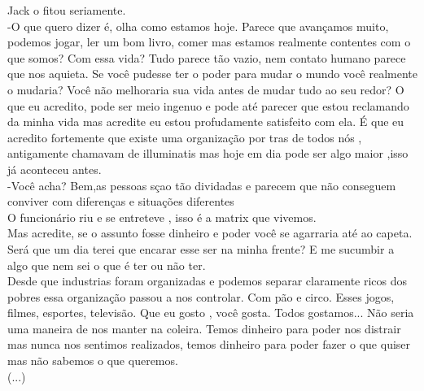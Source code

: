 \documentclass{book}
\begin{document}
Jack o fitou seriamente.\\
-O que quero dizer é, olha como estamos hoje. Parece que avançamos muito, podemos jogar, ler um bom livro, comer mas estamos realmente contentes com o que somos? Com essa vida? Tudo parece tão vazio, nem contato humano parece que nos aquieta. Se você pudesse ter o poder para mudar o mundo você realmente o mudaria? Você não melhoraria sua vida antes de mudar tudo ao seu redor? O que eu acredito, pode ser meio ingenuo e pode até parecer que estou reclamando da minha vida mas acredite eu estou profudamente satisfeito com ela. É que eu acredito fortemente que existe uma organização por tras de todos nós , antigamente chamavam de illuminatis mas hoje em dia pode ser algo maior ,isso já aconteceu antes. \\
-Você acha? Bem,as pessoas sçao tão dividadas e parecem que não conseguem conviver com diferenças e situações diferentes\\
O funcionário riu e se entreteve , isso é a matrix que vivemos.\\
Mas acredite, se o assunto fosse dinheiro e poder você se agarraria até ao capeta.\\
Será que um dia terei que encarar esse ser na minha frente? E me sucumbir a algo que nem sei o que é ter ou não ter.\\
 Desde que industrias foram organizadas e podemos separar claramente ricos dos pobres essa organização passou a nos controlar. Com pão e circo. Esses jogos, filmes, esportes, televisão. Que eu gosto , você gosta. Todos gostamos... Não seria uma maneira de nos manter na coleira. Temos dinheiro para poder nos distrair mas nunca nos sentimos realizados, temos dinheiro para poder fazer o que quiser mas não sabemos o que queremos. \\
 (...)
 
\end{document}
